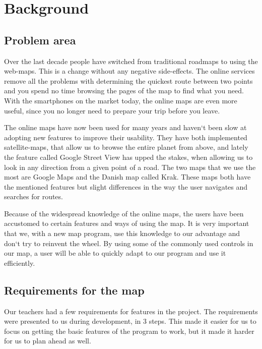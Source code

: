 \chapter{Background}
\label{BG}
\section{Problem area}
\label{BG-PR}
Over the last decade people have switched from traditional roadmaps 
to using the web-maps. This is a change without any negative side-effects. 
The online services remove all the problems with determining the quickest 
route between two points and you spend no time browsing the pages of 
the map to find what you need. With the smartphones on the market today, 
the online maps are even more useful, since you no longer need to 
prepare your trip before you leave.

The online maps have now been used for many years and haven`t been slow 
at adopting new features to improve their usability. They have both 
implemented satellite-maps, that allow us to browse the entire planet 
from above, and lately the feature called Google Street View has upped 
the stakes, when allowing us to look in any direction from a given point 
of a road. The two maps that we use the most are Google Maps and the 
Danish map called Krak. These maps both have the mentioned features 
but slight differences in the way the user navigates and searches 
for routes.

Because of the widespread knowledge of the online maps, the users 
have been accustomed to certain features and ways of using the map. 
It is very important that we, with a new map program, use this knowledge 
to our advantage and don`t try to reinvent the wheel. By using some 
of the commonly used controls in our map, a user will be able to quickly 
adapt to our program and use it efficiently. 

\section{Requirements for the map}
\label{BG-R}
Our teachers had a few requirements for features in the project. The
requirements were presented to us during development, in 3 steps. This made it
easier for us to focus on getting the basic features of the program to work, but
it made it harder for us to plan ahead as well.

